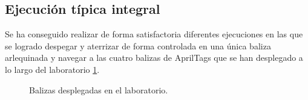 \subsection{Ejecución típica integral}

Se ha conseguido realizar de forma satisfactoria diferentes ejecuciones en las que se logrado despegar y aterrizar de forma controlada en una única baliza arlequinada y navegar a las cuatro balizas de AprilTags que se han desplegado a lo largo del laboratorio \ref{fig:balizasDesplegadas2}.

\begin{figure}[H]
	\begin{center}
		\centering
		\hspace{5mm}
	\end{center}
\end{figure}

\begin{figure}[H]
	\begin{center}
		\centering
		\hspace{5mm}
		\hspace{5mm}
		\caption{Balizas desplegadas en el laboratorio.}
		\label{fig:balizasDesplegadas2}	
	\end{center}
\end{figure}

